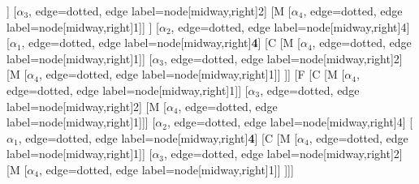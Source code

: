 \begin{forest}
[B
	[F
		[C
			[M
				[$\alpha_{4}$, edge=dotted, edge label={node[midway,right]{1}}]]
			[$\alpha_{3}$, edge=dotted, edge label={node[midway,right]{2}}]
			[M
				[$\alpha_{4}$, edge=dotted, edge label={node[midway,right]{1}}]]
		]
		[$\alpha_{2}$, edge=dotted, edge label={node[midway,right]{4}}]
		[$\alpha_{1}$, edge=dotted, edge label={node[midway,right]{\textbf{4}}}]
		[C
			[M
				[$\alpha_{4}$, edge=dotted, edge label={node[midway,right]{1}}]]
			[$\alpha_{3}$, edge=dotted, edge label={node[midway,right]{2}}]
			[M
				[$\alpha_{4}$, edge=dotted, edge label={node[midway,right]{1}}]]
		]]
	[F
		[C
			[M
				[$\alpha_{4}$, edge=dotted, edge label={node[midway,right]{1}}]]
			[$\alpha_{3}$, edge=dotted, edge label={node[midway,right]{2}}]
			[M
				[$\alpha_{4}$, edge=dotted, edge label={node[midway,right]{1}}]]]
		[$\alpha_{2}$, edge=dotted, edge label={node[midway,right]{4}}]
		[$\alpha_{1}$, edge=dotted, edge label={node[midway,right]{\textbf{4}}}]
		[C
			[M
				[$\alpha_{4}$, edge=dotted, edge label={node[midway,right]{1}}]]
			[$\alpha_{3}$, edge=dotted, edge label={node[midway,right]{2}}]
			[M
				[$\alpha_{4}$, edge=dotted, edge label={node[midway,right]{1}}]]
	]]]
\end{forest}
